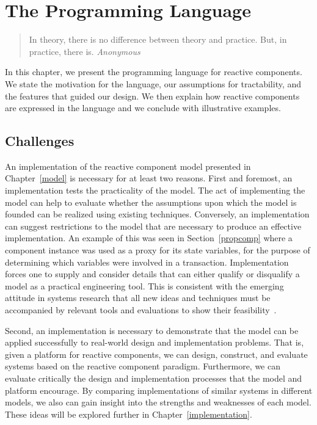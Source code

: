 \chapter{The \rcgo{} Programming Language}
\label{language}

\begin{quote}
In theory, there is no difference between theory and practice. \linebreak
But, in practice, there is.  \emph{Anonymous}
\end{quote}

In this chapter, we present the \rcgo{} programming language for reactive components.
We state the motivation for the language, our assumptions for tractability, and the features that guided our design.
We then explain how reactive components are expressed in the language and we conclude with illustrative examples.

\section{Challenges}
An implementation of the reactive component model presented in Chapter~\ref{model} is necessary for at least two reasons.
First and foremost, an implementation tests the practicality of the model.
The act of implementing the model can help to evaluate whether the assumptions upon which the model is founded can be realized using existing techniques.
Conversely, an implementation can suggest restrictions to the model that are necessary to produce an effective implementation.
An example of this was seen in Section~\ref{propcomp} where a component instance was used as a proxy for its state variables, for the purpose of determining which variables were involved in a transaction.
Implementation forces one to supply and consider details that can either qualify or disqualify a model as a practical engineering tool.
This is consistent with the emerging attitude in systems research that all new ideas and techniques must be accompanied by relevant tools and evaluations to show their feasibility~\cite{Krishnamurthi:2015:RSC:2739250.2658987}.

Second, an implementation is necessary to demonstrate that the model can be applied successfully to real-world design and implementation problems.
That is, given a platform for reactive components, we can design, construct, and evaluate systems based on the reactive component paradigm.
Furthermore, we can evaluate critically the design and implementation processes that the model and platform encourage.
By comparing implementations of similar systems in different models, we also can gain insight into the strengths and weaknesses of each model.
These ideas will be explored further in Chapter~\ref{implementation}.

